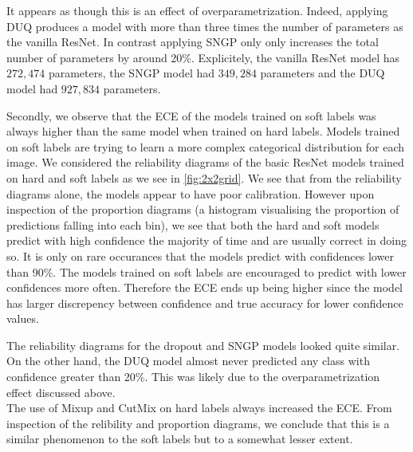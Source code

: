 \documentclass{article}
\begin{document}
It appears as though this is an effect of overparametrization. Indeed, applying DUQ produces a model with more than three times the number of parameters as the vanilla ResNet. In contrast applying SNGP only only increases the total number of parameters by around 20\%. Explicitely, the vanilla ResNet model has $272,474$ parameters, the SNGP model had $349,284$ parameters and the DUQ model had $927,834$ parameters. 

Secondly, we observe that the ECE of the models trained on soft labels was always higher than the same model when trained on hard labels. Models trained on soft labels are trying to learn a more complex categorical distribution for each image. We considered the reliability diagrams of the basic ResNet models trained on hard and soft labels as we see in \autoref{fig:2x2grid}. We see that from the reliability diagrams alone, the models appear to have poor calibration. However upon inspection of the proportion diagrams (a histogram visualising the proportion of predictions falling into each bin), we see that both the hard and soft models predict with high confidence the majority of time and are usually correct in doing so. It is only on rare occurances that the models predict with confidences lower than 90\%. 
The models trained on soft labels are encouraged to predict with lower confidences more often. Therefore the ECE ends up being higher since the model has larger discrepency between confidence and true accuracy for lower confidence values. 

The reliability diagrams for the dropout and SNGP models looked quite similar. On the other hand, the DUQ model almost never predicted any class with confidence greater than 20\%. This was likely due to the overparametrization effect discussed above. \\
The use of Mixup and CutMix on hard labels always increased the ECE. From inspection of the relibility and proportion diagrams, we conclude that this is a similar phenomenon to the soft labels but to a somewhat lesser extent. 
\end{document}
